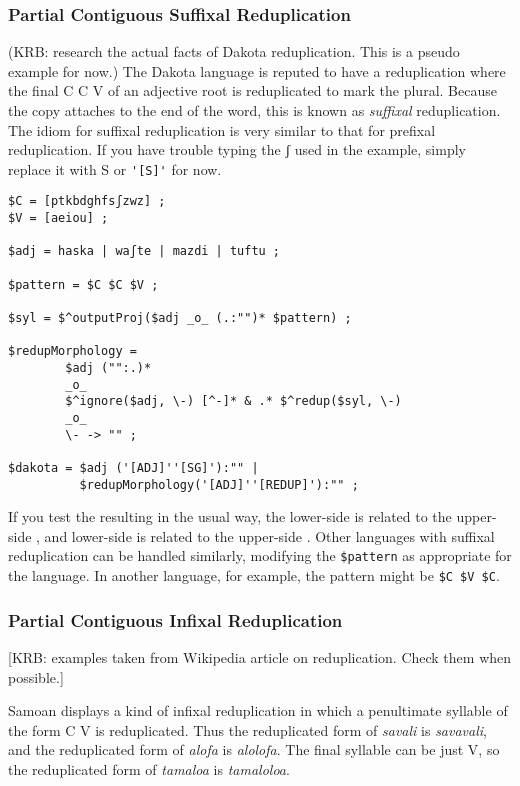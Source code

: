 \subsubsection{Partial Contiguous Suffixal Reduplication}

(KRB:  research the actual facts of Dakota reduplication.  This is a pseudo example for now.)
The Dakota language is reputed to have a reduplication where the final C C V of an
adjective root is reduplicated to mark the plural.  Because the copy attaches to the end of
the word, this is known as \emph{suffixal} reduplication.   The idiom for suffixal
reduplication is very similar to that for prefixal reduplication.  If you have trouble
typing the ʃ used in the example, simply replace it with S or \verb!'[S]'! for now.

\begin{Verbatim}
$C = [ptkbdghfsʃzwz] ;
$V = [aeiou] ;

$adj = haska | waʃte | mazdi | tuftu ;

$pattern = $C $C $V ;

$syl = $^outputProj($adj _o_ (.:"")* $pattern) ;

$redupMorphology = 
		$adj ("":.)*
        _o_
        $^ignore($adj, \-) [^-]* & .* $^redup($syl, \-)
        _o_
        \- -> "" ;

$dakota = $adj ('[ADJ]''[SG]'):"" |
          $redupMorphology('[ADJ]''[REDUP]'):"" ;
\end{Verbatim}

If you test the resulting \fst{} in the usual way, the lower-side
 is related to the
upper-side , and lower-side  is related to the upper-side
.  Other languages with suffixal reduplication can be handled similarly,
modifying the \verb!$pattern! as appropriate for the language.  In another language, for example,
the pattern might be \verb!$C $V $C!.

\subsubsection{Partial Contiguous Infixal Reduplication}

[KRB:  examples taken from Wikipedia article on reduplication.  Check
them when possible.]

Samoan displays a kind of infixal reduplication in which a penultimate
syllable of the form C V is reduplicated.  Thus the reduplicated form of
\emph{savali} is \emph{savavali}, and the reduplicated form of
\emph{alofa} is \emph{alolofa}.  The final syllable can be just V, so
the reduplicated form of \emph{tamaloa} is \emph{tamaloloa}.

